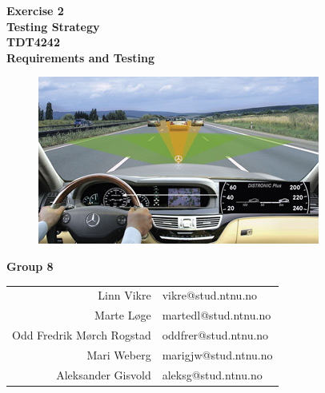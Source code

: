 \begin{titlepage}
\begin{center}

{\Huge \bf Exercise 2} \\[0.5cm]
{\Huge \bf Testing Strategy} \\[1.0cm]

{\Large \bf TDT4242} \\ [0.5cm]
{\Large \bf Requirements and Testing} \\[2.0cm]

\begin{figure}[H]
	\centering
	\includegraphics[width=\textwidth]{pics/frontpage.jpg}
\end{figure}

\vspace{2cm}
{\Large \bf Group 8} \\
\vspace{1cm}

\begin{table}[H]
	\centering
	\begin{tabular}{ r  l }
		Linn Vikre & vikre@stud.ntnu.no \\ 
		Marte Løge & martedl@stud.ntnu.no \\ 
		Odd Fredrik Mørch Rogstad & oddfrer@stud.ntnu.no \\ 
		Mari Weberg & marigjw@stud.ntnu.no \\ 
		Aleksander Gisvold & aleksg@stud.ntnu.no \\ 
	\end{tabular}
\end{table}

\end{center}
\end{titlepage}